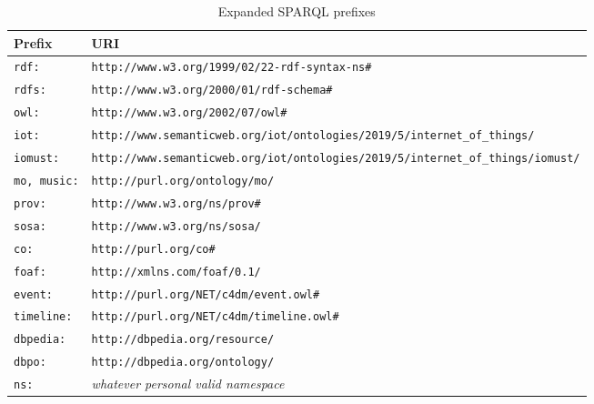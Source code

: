 \documentclass[11pt, twoside, openright]{report}   	%
\begin{document}
\vspace*{1.5cm}
\begin{table}[!h]
\centering \footnotesize
\caption{Expanded SPARQL prefixes}
\label{tab:prefixes}
\begin{tabular}{ll}
\textbf{Prefix}    &   \textbf{URI}    \\ \hline
\texttt{rdf:}    &   \texttt{http://www.w3.org/1999/02/22-rdf-syntax-ns\#} \\ \hline
\texttt{rdfs:}   &   \texttt{http://www.w3.org/2000/01/rdf-schema\#}\\ \hline
\texttt{owl:}    &   \texttt{http://www.w3.org/2002/07/owl\#} \\ \hline
\texttt{iot:}   &   \texttt{http://www.semanticweb.org/iot/ontologies/2019/5/internet\_of\_things/}\\ \hline  
\texttt{iomust:}    &  \texttt{http://www.semanticweb.org/iot/ontologies/2019/5/internet\_of\_things/iomust/} \\ \hline
\texttt{mo, music:}    &   \texttt{http://purl.org/ontology/mo/}\\ \hline
\texttt{prov:}   &   \texttt{http://www.w3.org/ns/prov\#} \\ \hline
\texttt{sosa:}   &  \texttt{http://www.w3.org/ns/sosa/} \\ \hline
\texttt{co:}   &  \texttt{http://purl.org/co\#} \\ \hline
\texttt{foaf:}   &  \texttt{http://xmlns.com/foaf/0.1/} \\ \hline
\texttt{event:}   &  \texttt{http://purl.org/NET/c4dm/event.owl\#} \\ \hline
\texttt{timeline:}   &  \texttt{http://purl.org/NET/c4dm/timeline.owl\#} \\ \hline
\texttt{dbpedia:} &  \texttt{http://dbpedia.org/resource/} \\ \hline
\texttt{dbpo:} & \texttt{http://dbpedia.org/ontology/} \\ \hline
\texttt{ns:} &  \textit{whatever personal valid namespace} \\ \hline
\end{tabular}
\end{table}

\listoffigures
{}
\listoftables
\newpage


\begin{multicols}{2}
\footnotesize

\end{multicols}

%

%
\end{document}

